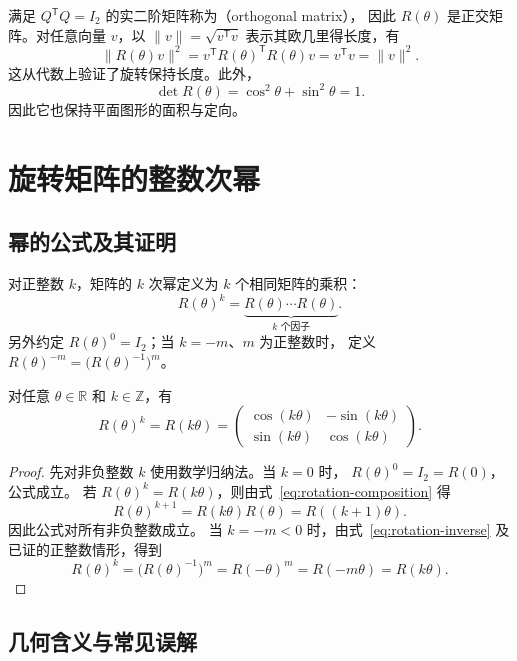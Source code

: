 \documentclass[UTF8,12pt,a4paper,fontset=fandol]{ctexart}
\begin{document}
满足 $Q^{\mathsf T}Q=I_2$ 的实二阶矩阵称为（orthogonal matrix），
因此 $R(\theta)$ 是正交矩阵。对任意向量 $v$，以
$\|v\|=\sqrt{v^{\mathsf T}v}$ 表示其欧几里得长度，有
\[
  \|R(\theta)v\|^2
  =v^{\mathsf T}R(\theta)^{\mathsf T}R(\theta)v
  =v^{\mathsf T}v=\|v\|^2.
\]
这从代数上验证了旋转保持长度。此外，
\[
  \det R(\theta)=\cos^2\theta+\sin^2\theta=1.
\]
因此它也保持平面图形的面积与定向。

\section{旋转矩阵的整数次幂}

\subsection{幂的公式及其证明}

对正整数 $k$，矩阵的 $k$ 次幂定义为 $k$ 个相同矩阵的乘积：
\[
  R(\theta)^k=\underbrace{R(\theta)\cdots R(\theta)}_{k\text{ 个因子}}.
\]
另外约定 $R(\theta)^0=I_2$；当 $k=-m$、$m$ 为正整数时，
定义 $R(\theta)^{-m}=\bigl(R(\theta)^{-1}\bigr)^m$。

\begin{theorem}[旋转矩阵的整数次幂]
\label{thm:rotation-power}
对任意 $\theta\in\mathbb R$ 和 $k\in\mathbb Z$，有
\begin{equation}
  \boxed{R(\theta)^k=R(k\theta)
  =\begin{pmatrix}
    \cos(k\theta)&-\sin(k\theta)\\
    \sin(k\theta)&\cos(k\theta)
  \end{pmatrix}.}
  \label{eq:rotation-power}
\end{equation}
\end{theorem}

\begin{proof}
先对非负整数 $k$ 使用数学归纳法。当 $k=0$ 时，
$R(\theta)^0=I_2=R(0)$，公式成立。
若 $R(\theta)^k=R(k\theta)$，则由式~\eqref{eq:rotation-composition} 得
\[
  R(\theta)^{k+1}=R(k\theta)R(\theta)=R((k+1)\theta).
\]
因此公式对所有非负整数成立。
当 $k=-m<0$ 时，由式~\eqref{eq:rotation-inverse} 及已证的正整数情形，得到
\[
  R(\theta)^k=\bigl(R(\theta)^{-1}\bigr)^m
  =R(-\theta)^m=R(-m\theta)=R(k\theta).
\]
\end{proof}

\subsection{几何含义与常见误解}
\end{document}
